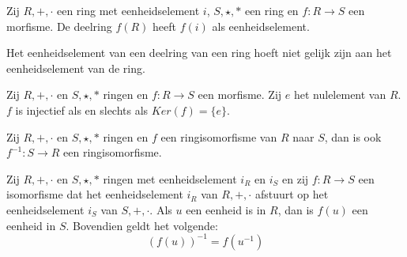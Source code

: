 \documentclass[main.tex]{subfiles}
\begin{document}
\begin{ei}
  Zij $R,+,\cdot$ een ring met eenheidselement $i$, $S,\star,*$ een ring en $f:R \rightarrow S$ een morfisme.
  De deelring $f(R)$ heeft $f(i)$ als eenheidselement.
\end{ei}

\begin{opm}
  Het eenheidselement van een deelring van een ring hoeft niet gelijk zijn aan het eenheidselement van de ring.
\end{opm}

\begin{ei}
  Zij $R,+,\cdot$ en $S,\star,*$ ringen en $f:R \rightarrow S$ een morfisme.
  Zij $e$ het nulelement van $R$.
  $f$ is injectief als en slechts als $Ker(f) = \{e\}$.
\end{ei}

\begin{ei}
  Zij $R,+,\cdot$ en $S,\star,*$ ringen en $f$ een ringisomorfisme van $R$ naar $S$, dan is ook $f^{-1}: S \rightarrow R$ een ringisomorfisme.
\end{ei}

\begin{ei}
  \label{ei:ringmorfisme-behoudt-multiplicatieve-inverse}
  Zij $R,+,\cdot$ en $S,\star,*$ ringen met eenheidselement $i_{R}$ en $i_{S}$ en zij $f: R\rightarrow S$ een isomorfisme dat het eenheidselement $i_{R}$ van $R,+,\cdot$ afstuurt op het eenheidselement $i_{S}$ van $S,+,\cdot$.
  Als $u$ een eenheid is in $R$, dan is $f(u)$ een eenheid in $S$.
  Bovendien geldt het volgende:
  \[ (f(u))^{-1} = f(u^{-1}) \]
\end{ei}
\end{document}
